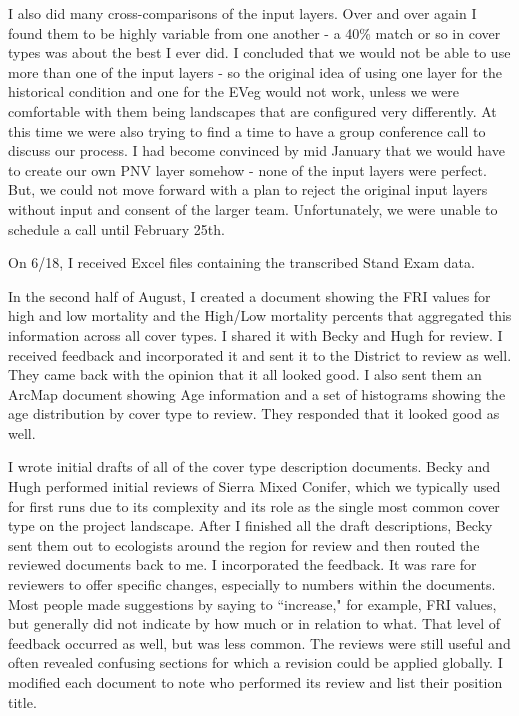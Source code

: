 \documentclass{book}
\begin{document}
I also did many cross-comparisons of the input layers. Over and over again I found them to be highly variable from one another - a 40\% match or so in cover types was about the best I ever did. I concluded that we would not be able to use more than one of the input layers - so the original idea of using one layer for the historical condition and one for the EVeg would not work, unless we were comfortable with them being landscapes that are configured very differently. At this time we were also trying to find a time to have a group conference call to discuss our process. I had become convinced by mid January that we would have to create our own PNV layer somehow - none of the input layers were perfect. But, we could not move forward with a plan to reject the original input layers without input and consent of the larger team. Unfortunately, we were unable to schedule a call until February 25th.

On 6/18, I received Excel files containing the transcribed Stand Exam data.

In the second half of August, I created a document showing the FRI values for high and low mortality and the High/Low mortality percents that aggregated this information across all cover types. I shared it with Becky and Hugh for review. I received feedback and incorporated it and sent it to the District to review as well. They came back with the opinion that it all looked good. I also sent them an ArcMap document showing Age information and a set of histograms showing the age distribution by cover type to review. They responded that it looked good as well. 

I wrote initial drafts of all of the cover type description documents. Becky and Hugh performed initial reviews of Sierra Mixed Conifer, which we typically used for first runs due to its complexity and its role as the single most common cover type on the project landscape. After I finished all the draft descriptions, Becky sent them out to ecologists around the region for review and then routed the reviewed documents back to me. I incorporated the feedback. It was rare for reviewers to offer specific changes, especially to numbers within the documents. Most people made suggestions by saying to ``increase," for example, FRI values, but generally did not indicate by how much or in relation to what. That level of feedback occurred as well, but was less common. The reviews were still useful and often revealed confusing sections for which a revision could be applied globally. I modified each document to note who performed its review and list their position title. 
\end{document}
